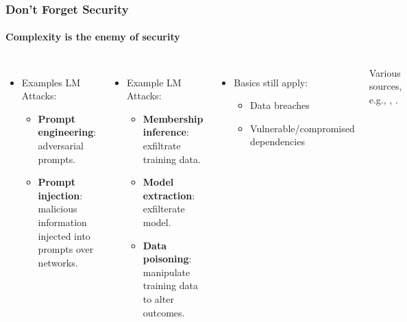 \documentclass[11pt,
               aspectratio=169,
               hyperref={colorlinks}
               ]{beamer}
\begin{document}
		\begin{frame}
			
			\frametitle{Don't Forget Security}
			\framesubtitle{Complexity is the enemy of security}
			
			\begin{columns}
				\vspace{-5pt}
				\begin{itemize}
				\item Examples LM Attacks:
					\begin{itemize}
						\item \textbf{Prompt engineering}: adversarial prompts.
						\item \textbf{Prompt injection}: malicious information injected into prompts over networks.
					\end{itemize}
				\end{itemize}

				\begin{itemize}
				\item Example LM Attacks:
					\begin{itemize}
						\item \textbf{Membership inference}: exfiltrate training data.
						\item \textbf{Model extraction}: exfilterate model.
						\item \textbf{Data poisoning}: manipulate training data to alter outcomes.
					\end{itemize}
				\end{itemize}

				\begin{itemize}				
				\item Basics still apply:
					\begin{itemize}
						\item Data breaches
						\item Vulnerable/compromised dependencies
					\end{itemize}
				\end{itemize}
				\vspace{5pt}
 \hspace{12pt}\tiny{Various sources, e.g., \cite{Adversa}, \cite{prompt_injection}.}
			

\end{columns}
\end{frame}
\end{document}
